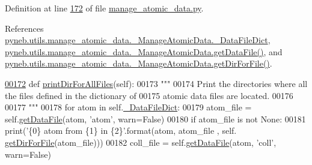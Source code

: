 Definition at line \hyperlink{manage__atomic__data_8py_source_l00172}{172} of file \hyperlink{manage__atomic__data_8py_source}{manage\+\_\+atomic\+\_\+data.\+py}.



References \hyperlink{manage__atomic__data_8py_source_l00078}{pyneb.\+utils.\+manage\+\_\+atomic\+\_\+data.\+\_\+\+Manage\+Atomic\+Data.\+\_\+\+Data\+File\+Dict}, \hyperlink{manage__atomic__data_8py_source_l00297}{pyneb.\+utils.\+manage\+\_\+atomic\+\_\+data.\+\_\+\+Manage\+Atomic\+Data.\+get\+Data\+File()}, and \hyperlink{manage__atomic__data_8py_source_l00144}{pyneb.\+utils.\+manage\+\_\+atomic\+\_\+data.\+\_\+\+Manage\+Atomic\+Data.\+get\+Dir\+For\+File()}.


\begin{DoxyCode}
\hypertarget{classpyneb_1_1utils_1_1manage__atomic__data_1_1___manage_atomic_data_l00172}{}\hyperlink{classpyneb_1_1utils_1_1manage__atomic__data_1_1___manage_atomic_data_ae6058f81e349162d18cc2baca19b328e}{00172}     \textcolor{keyword}{def }\hyperlink{classpyneb_1_1utils_1_1manage__atomic__data_1_1___manage_atomic_data_ae6058f81e349162d18cc2baca19b328e}{printDirForAllFiles}(self):
00173         \textcolor{stringliteral}{"""}
00174 \textcolor{stringliteral}{        Print the directories where all the files defined in the dictionary of }
00175 \textcolor{stringliteral}{            atomic data files are located.}
00176 \textcolor{stringliteral}{}
00177 \textcolor{stringliteral}{        """}
00178         \textcolor{keywordflow}{for} atom \textcolor{keywordflow}{in} self.\hyperlink{classpyneb_1_1utils_1_1manage__atomic__data_1_1___manage_atomic_data_a25a8e0770b6d8a375cfc9092d600684d}{\_DataFileDict}:
00179             atom\_file = self.\hyperlink{classpyneb_1_1utils_1_1manage__atomic__data_1_1___manage_atomic_data_a289b3ad01e359e3550b2384362c36990}{getDataFile}(atom, \textcolor{stringliteral}{'atom'}, warn=\textcolor{keyword}{False})
00180             \textcolor{keywordflow}{if} atom\_file \textcolor{keywordflow}{is} \textcolor{keywordflow}{not} \textcolor{keywordtype}{None}:
00181                 print(\textcolor{stringliteral}{'\{0\} atom from \{1\} in \{2\}'}.format(atom, atom\_file , self.
      \hyperlink{classpyneb_1_1utils_1_1manage__atomic__data_1_1___manage_atomic_data_acd017c8296821230170a520927be8c66}{getDirForFile}(atom\_file)))
00182             coll\_file = self.\hyperlink{classpyneb_1_1utils_1_1manage__atomic__data_1_1___manage_atomic_data_a289b3ad01e359e3550b2384362c36990}{getDataFile}(atom, \textcolor{stringliteral}{'coll'}, warn=\textcolor{keyword}{False})

\end{DoxyCode}
